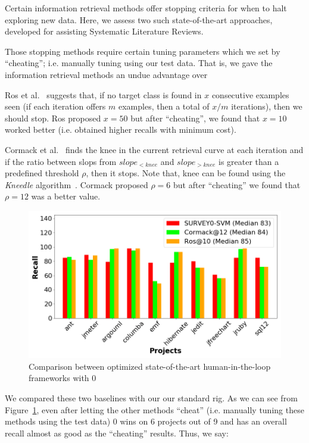 \documentclass[10pt,conference]{IEEEtran}
\begin{document}
Certain   information retrieval methods offer   stopping criteria
for when to halt exploring new data. 
Here, we assess two such state-of-the-art approaches, developed
for assisting  Systematic Literature Reviews.

Those stopping  methods require
certain tuning parameters which we set by ``cheating''; i.e.  manually
tuning using  our test data. That is, we gave
the information retrieval methods an undue advantage over {}

  Ros et al.~\cite{ros2017machine}  suggests that, if no target class is found in $x$ consecutive examples seen (if each iteration offers $m$ examples, then a total of $x/m$ iterations), then we should stop.
Ros proposed $x=50$ but after ``cheating'',    we found
that    $x=10$ worked better (i.e. obtained higher recalls with minimum cost).

  Cormack et al.~\cite{cormack2016engineering}
finds the  knee in the current retrieval curve at each iteration and if the ratio between slops from $slope_{<knee}$ and $slope_{>knee}$ is greater than a predefined threshold $\rho$, then it stops. 
Note that, knee can be found using the \textit{Kneedle} algorithm~\cite{satopaa2011finding}. 
Cormack proposed  $\rho=6$
but after ``cheating'' we found that  $\rho=12$ was   a better value.


\begin{figure}[!t]
\begin{center}
\includegraphics[width=\linewidth]{rq3_stop_baseline.png}
\caption{Comparison between optimized state-of-the-art human-in-the-loop frameworks with {\IT}0}
\label{fig rq2 stopping recall}
\end{center}
\end{figure}

We compared these two baselines with our our standard rig.
As we can see from Figure~\ref{fig rq2 stopping recall}, even after
letting the other methods ``cheat'' (i.e. manually tuning these methods using the test data)  {\IT}0 wins on 6 projects out of 9 and has an overall recall almost as good as the   ``cheating'' results. 
Thus, we   say:
\end{document}
